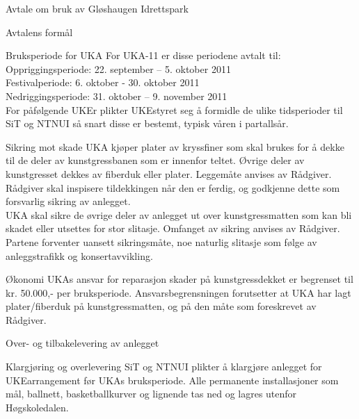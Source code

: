 \begin{instruks}{Avtale om bruk av Gløshaugen Idrettspark}
\begin{instruksledd}{Avtalens formål}
\begin{instruksledd}{Bruksperiode for UKA}
For UKA-11 er disse periodene avtalt til:\\

Oppriggingsperiode: 	22. september – 5. oktober 2011\\
Festivalperiode: 	6. oktober - 30. oktober 2011\\
Nedriggingsperiode:	31. oktober – 9. november 2011\\

For påfølgende UKEr plikter UKEstyret seg å formidle de ulike tidsperioder til SiT og NTNUI så snart disse er bestemt, typisk våren i partallsår.
\end{instruksledd}

\begin{instruksledd}{Sikring mot skade}
UKA kjøper plater av kryssfiner som skal brukes for å dekke til de deler av kunstgressbanen som er innenfor teltet.  Øvrige deler av kunstgresset dekkes av fiberduk eller plater.  Leggemåte anvises av Rådgiver. Rådgiver skal inspisere tildekkingen når den er ferdig, og godkjenne dette som forsvarlig sikring av anlegget.\\  

UKA skal sikre de øvrige deler av anlegget ut over kunstgressmatten som kan bli skadet eller utsettes for stor slitasje. Omfanget av sikring anvises av Rådgiver. \\
 
Partene forventer uansett sikringsmåte, noe naturlig slitasje som følge av anleggstrafikk og konsertavvikling.\\
\end{instruksledd}
 
\begin{instruksledd}{Økonomi}
UKAs ansvar for reparasjon skader på kunstgressdekket er begrenset til kr. 50.000,- per bruksperiode.  Ansvarsbegrensningen forutsetter at UKA har lagt plater/fiberduk på kunstgressmatten, og på den måte som foreskrevet av Rådgiver.\\
\end{instruksledd}
  
\begin{instruksledd}{Over- og tilbakelevering av anlegget}
\end{instruksledd}

\begin{instruksledd}{Klargjøring og overlevering}
SiT og NTNUI plikter å klargjøre anlegget for UKEarrangement før UKAs bruksperiode. Alle permanente installasjoner som mål, ballnett, basketballkurver og lignende tas ned og lagres utenfor Høgskoledalen.\\


\end{instruksledd}
\end{instruksledd}
\end{instruks}
